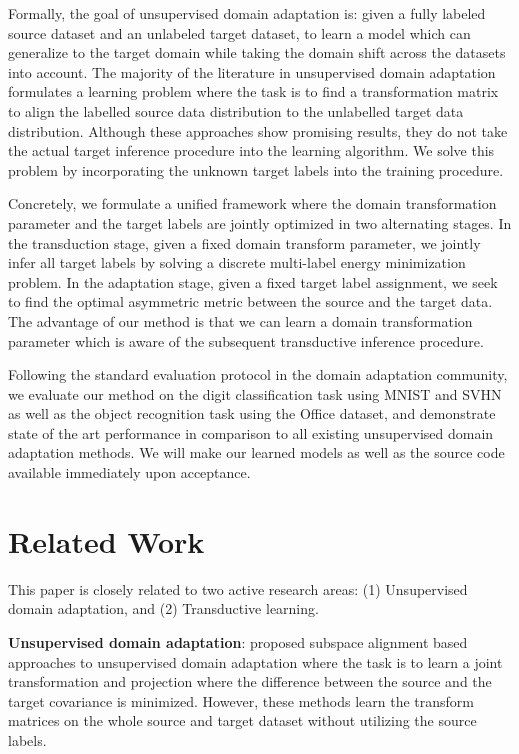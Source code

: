 \documentclass{article}
\begin{document}
Formally, the goal of unsupervised domain adaptation is: given a fully labeled source dataset and an unlabeled target dataset, to learn a model which can generalize to the target domain while taking the domain shift across the datasets into account. The majority of the literature \cite{gong12, baochen15, fernando13, baochen16, tommasi13} in unsupervised domain adaptation formulates a learning problem where the task is to find a transformation matrix to align the labelled source data distribution to the unlabelled target data distribution. Although these approaches show promising results, they do not take the actual target inference procedure into the learning algorithm. We solve this problem by incorporating the unknown target labels into the training procedure.

Concretely, we formulate a unified framework where the domain transformation parameter and the target labels are jointly optimized in two alternating stages. In the transduction stage, given a fixed domain transform parameter, we jointly infer all target labels by solving a discrete multi-label energy minimization problem. In the adaptation stage, given a fixed target label assignment, we seek to find the optimal asymmetric metric  between the source and the target data. The advantage of our method is that we can learn a domain transformation parameter which is aware of the subsequent transductive inference procedure. 

Following the standard evaluation protocol in the domain adaptation community, we evaluate our method on the digit classification task using MNIST \cite{mnist} and SVHN\cite{svhn} as well as the object recognition task using the Office \cite{office} dataset, and demonstrate state of the art performance in comparison to all existing unsupervised domain adaptation methods.  We will make our learned models as well as the source code available immediately upon acceptance.

\section{Related Work} 

This paper is closely related to two active research areas: (1) Unsupervised domain adaptation, and (2) Transductive learning.

\textbf{Unsupervised domain adaptation}: \cite{gong12, baochen15, fernando13, baochen16} proposed subspace alignment based approaches to unsupervised domain adaptation where the task is to learn a joint transformation and projection where the difference between the source and the target covariance is minimized. However, these methods learn the transform matrices on the whole source and target dataset without utilizing the source labels. 
\end{document}
